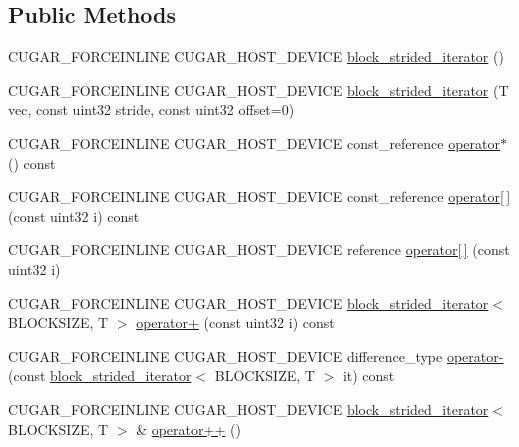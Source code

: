 \subsection*{Public Methods}
\begin{DoxyCompactItemize}
\item 
C\+U\+G\+A\+R\+\_\+\+F\+O\+R\+C\+E\+I\+N\+L\+I\+NE C\+U\+G\+A\+R\+\_\+\+H\+O\+S\+T\+\_\+\+D\+E\+V\+I\+CE \hyperlink{structcugar_1_1block__strided__iterator_a046692224c95e2f75d3705be1e457f6d}{block\+\_\+strided\+\_\+iterator} ()
\item 
C\+U\+G\+A\+R\+\_\+\+F\+O\+R\+C\+E\+I\+N\+L\+I\+NE C\+U\+G\+A\+R\+\_\+\+H\+O\+S\+T\+\_\+\+D\+E\+V\+I\+CE \hyperlink{structcugar_1_1block__strided__iterator_a72ed3d8aeba8ae6151ebee6db08325b0}{block\+\_\+strided\+\_\+iterator} (T vec, const uint32 stride, const uint32 offset=0)
\item 
C\+U\+G\+A\+R\+\_\+\+F\+O\+R\+C\+E\+I\+N\+L\+I\+NE C\+U\+G\+A\+R\+\_\+\+H\+O\+S\+T\+\_\+\+D\+E\+V\+I\+CE const\+\_\+reference \hyperlink{structcugar_1_1block__strided__iterator_a8f6c671814eb044e34f57475a17fda07}{operator$\ast$} () const
\item 
C\+U\+G\+A\+R\+\_\+\+F\+O\+R\+C\+E\+I\+N\+L\+I\+NE C\+U\+G\+A\+R\+\_\+\+H\+O\+S\+T\+\_\+\+D\+E\+V\+I\+CE const\+\_\+reference \hyperlink{structcugar_1_1block__strided__iterator_a54df5dbe31b4bff8a60e7b42bcc51f7a}{operator\mbox{[}$\,$\mbox{]}} (const uint32 i) const
\item 
C\+U\+G\+A\+R\+\_\+\+F\+O\+R\+C\+E\+I\+N\+L\+I\+NE C\+U\+G\+A\+R\+\_\+\+H\+O\+S\+T\+\_\+\+D\+E\+V\+I\+CE reference \hyperlink{structcugar_1_1block__strided__iterator_ad652cb1f0468692a7145d113b749a525}{operator\mbox{[}$\,$\mbox{]}} (const uint32 i)
\item 
C\+U\+G\+A\+R\+\_\+\+F\+O\+R\+C\+E\+I\+N\+L\+I\+NE C\+U\+G\+A\+R\+\_\+\+H\+O\+S\+T\+\_\+\+D\+E\+V\+I\+CE \hyperlink{structcugar_1_1block__strided__iterator}{block\+\_\+strided\+\_\+iterator}$<$ B\+L\+O\+C\+K\+S\+I\+ZE, T $>$ \hyperlink{structcugar_1_1block__strided__iterator_a864473fd53d2fea29614331eab808826}{operator+} (const uint32 i) const
\item 
C\+U\+G\+A\+R\+\_\+\+F\+O\+R\+C\+E\+I\+N\+L\+I\+NE C\+U\+G\+A\+R\+\_\+\+H\+O\+S\+T\+\_\+\+D\+E\+V\+I\+CE difference\+\_\+type \hyperlink{structcugar_1_1block__strided__iterator_aceb899ec2892dd99b842ef0551b65b30}{operator-\/} (const \hyperlink{structcugar_1_1block__strided__iterator}{block\+\_\+strided\+\_\+iterator}$<$ B\+L\+O\+C\+K\+S\+I\+ZE, T $>$ it) const
\item 
C\+U\+G\+A\+R\+\_\+\+F\+O\+R\+C\+E\+I\+N\+L\+I\+NE C\+U\+G\+A\+R\+\_\+\+H\+O\+S\+T\+\_\+\+D\+E\+V\+I\+CE \hyperlink{structcugar_1_1block__strided__iterator}{block\+\_\+strided\+\_\+iterator}$<$ B\+L\+O\+C\+K\+S\+I\+ZE, T $>$ \& \hyperlink{structcugar_1_1block__strided__iterator_a0c43786d5b8c62d2cfbf7226cf0c4f63}{operator++} ()
\end{DoxyCompactItemize}
